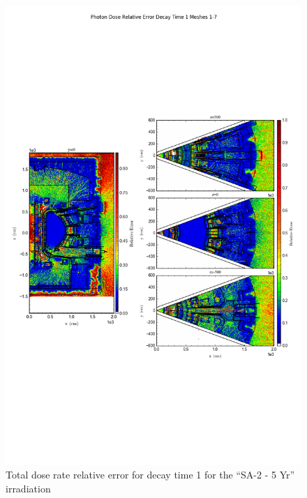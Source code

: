 \documentclass[12pt]{article}
\begin{document}
\begin{figure}[ht!]
\centering
\includegraphics[trim={0cm 8cm, 0cm 8cm},clip,scale=0.75]{../plots/final_model/10year/Photon_Dose_Relative_Error_Decay_Time_1_Meshes_1-7.png}
\caption{Total dose rate relative error for decay time 1 for the ``SA-2 - 5 Yr'' irradiation}
\label{fig:photons_10y_dc1_nob4c_relerr}
\end{figure}
\clearpage
\end{document}

